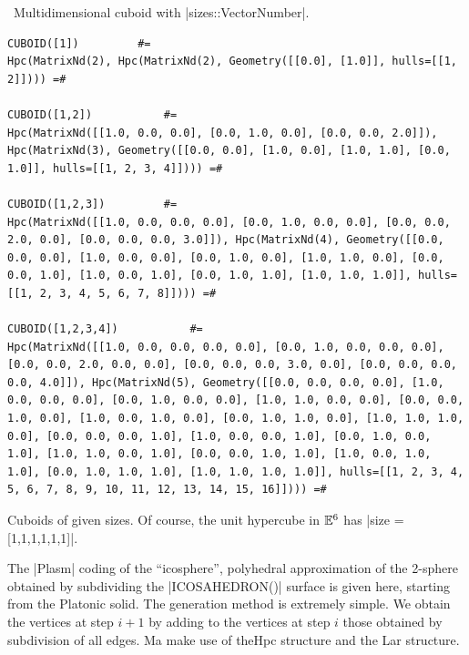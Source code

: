 \begin{coding}\
Multidimensional cuboid with |sizes::Vector{Number}|.
\begin{lstlisting}[language=JuliaLocal, style=julia, mathescape=true]
CUBOID([1])			#=
Hpc(MatrixNd(2), Hpc(MatrixNd(2), Geometry([[0.0], [1.0]], hulls=[[1, 2]]))) =#

CUBOID([1,2])			#=
Hpc(MatrixNd([[1.0, 0.0, 0.0], [0.0, 1.0, 0.0], [0.0, 0.0, 2.0]]), Hpc(MatrixNd(3), Geometry([[0.0, 0.0], [1.0, 0.0], [1.0, 1.0], [0.0, 1.0]], hulls=[[1, 2, 3, 4]]))) =#

CUBOID([1,2,3])			#=
Hpc(MatrixNd([[1.0, 0.0, 0.0, 0.0], [0.0, 1.0, 0.0, 0.0], [0.0, 0.0, 2.0, 0.0], [0.0, 0.0, 0.0, 3.0]]), Hpc(MatrixNd(4), Geometry([[0.0, 0.0, 0.0], [1.0, 0.0, 0.0], [0.0, 1.0, 0.0], [1.0, 1.0, 0.0], [0.0, 0.0, 1.0], [1.0, 0.0, 1.0], [0.0, 1.0, 1.0], [1.0, 1.0, 1.0]], hulls=[[1, 2, 3, 4, 5, 6, 7, 8]]))) =#

CUBOID([1,2,3,4])			#=
Hpc(MatrixNd([[1.0, 0.0, 0.0, 0.0, 0.0], [0.0, 1.0, 0.0, 0.0, 0.0], [0.0, 0.0, 2.0, 0.0, 0.0], [0.0, 0.0, 0.0, 3.0, 0.0], [0.0, 0.0, 0.0, 0.0, 4.0]]), Hpc(MatrixNd(5), Geometry([[0.0, 0.0, 0.0, 0.0], [1.0, 0.0, 0.0, 0.0], [0.0, 1.0, 0.0, 0.0], [1.0, 1.0, 0.0, 0.0], [0.0, 0.0, 1.0, 0.0], [1.0, 0.0, 1.0, 0.0], [0.0, 1.0, 1.0, 0.0], [1.0, 1.0, 1.0, 0.0], [0.0, 0.0, 0.0, 1.0], [1.0, 0.0, 0.0, 1.0], [0.0, 1.0, 0.0, 1.0], [1.0, 1.0, 0.0, 1.0], [0.0, 0.0, 1.0, 1.0], [1.0, 0.0, 1.0, 1.0], [0.0, 1.0, 1.0, 1.0], [1.0, 1.0, 1.0, 1.0]], hulls=[[1, 2, 3, 4, 5, 6, 7, 8, 9, 10, 11, 12, 13, 14, 15, 16]]))) =#
\end{lstlisting}
Cuboids of given sizes. Of course, the unit hypercube in $\mathbb{E}^6$ has |size = [1,1,1,1,1,1]|. 
\end{coding}

The |Plasm| coding of the “icosphere”, polyhedral approximation of the 2-sphere obtained by subdividing the |ICOSAHEDRON()| surface is given here, starting from the Platonic solid. The generation method is extremely simple. We obtain the vertices at step $i+1$ by adding to the vertices at step $i$ those obtained by subdivision of all edges. Ma make use of theHpc structure and the Lar structure.


